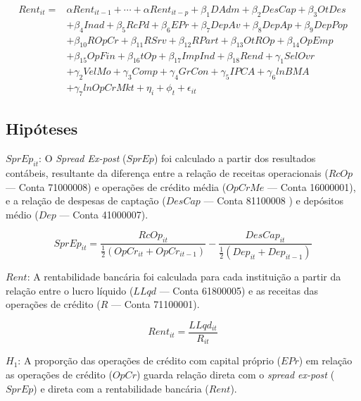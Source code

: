 \documentclass[
  12pt,
  12pt,
  openright,
  oneside,
  a4paper,
  chapter=TITLE,
  section=TITLE,
  subsection=TITLE,
  subsubsection=TITLE,
  portugues,
  sumario=tradicional]{abntex2}
\begin{document}
\begin{equation}\label{eq:modelfinal02}
\begin{aligned}
Rent_{it} = & \alpha Rent_{it-1}+ \cdots +\alpha Rent_{it-p} + \beta_{1}{DAdm} +  \beta_{2}{DesCap} + \beta_{3}{OtDes} \\ 
& + \beta_{4}{Inad} + \beta_{5}{RcPd} +  \beta_{6}{EPr} + \beta_{7}{DepAv} + \beta_{8}{DepAp} + \beta_{9}{DepPop} \\ 
& + \beta_{10}{ROpCr} + \beta_{11}{RSrv} + \beta_{12}{RPart} + \beta_{13}{OtROp} +  \beta_{14}{OpEmp} \\
& + \beta_{15}{OpFin} + \beta_{16}{tOp} + \beta_{17}{ImpInd} + \beta_{18}{Rend} + \gamma_{1}{SelOvr} \\
& + \gamma_{2}{VelMo} + \gamma_{3}{Comp} +  \gamma_{4}{GrCon} + \gamma_{5}{IPCA} + \gamma_{6}{lnBMA} \\
& + \gamma_{7}{lnOpCrMkt} + \eta_{i} + \phi_{t} + \epsilon_{it}   
\end{aligned}
\end{equation}

\subsection{Hipóteses}

\(SprEp_{it}\): O \emph{Spread Ex-post} (\(SprEp\)) foi calculado a partir dos resultados contábeis, resultante da diferença entre a relação de receitas operacionais (\(RcOp\) --- Conta 71000008) e operações de crédito média (\(OpCrMe\) --- Conta 16000001), e a relação de despesas de captação (\(DesCap\) --- Conta 81100008 ) e depósitos médio (\(Dep\) --- Conta 41000007).

\begin{equation}\label{eq:sprbase}
SprEp_{it} = \frac{RcOp_{it}}{\frac{1}{2}(OpCr_{it} + OpCr_{it-1}) } - \frac{DesCap_{it}}{\frac{1}{2}(Dep_{it} + Dep_{it-1})}
\end{equation}

\(Rent\): A rentabilidade bancária foi calculada para cada instituição a partir da relação entre o lucro líquido (\(LLqd\) --- Conta 61800005) e as receitas das operações de crédito (\(R\) --- Conta 71100001).

\begin{equation}
Rent_{it} = \frac{LLqd_{it}}{R_{it}}
\end{equation}

\(H_{1}\): A proporção das operações de crédito com capital próprio (\(EPr\)) em relação as operações de crédito (\(OpCr\)) guarda relação direta com o \emph{spread ex-post} (\(SprEp\)) e direta com a rentabilidade bancária (\(Rent\)).
\end{document}
